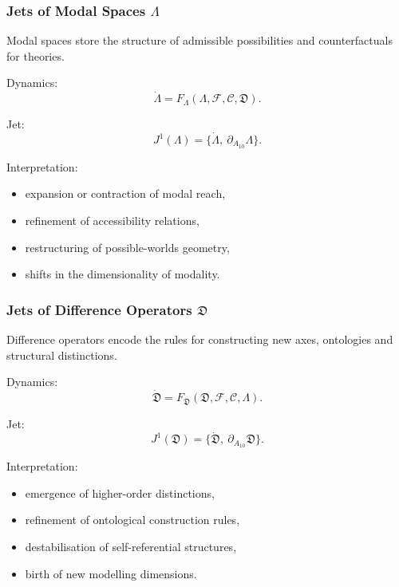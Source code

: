 \subsubsection{Jets of Modal Spaces \texorpdfstring{$\Lambda$}{\Lambda}}

Modal spaces store the structure of admissible possibilities and
counterfactuals for theories.

Dynamics:
\[
\dot{\Lambda}
=
F_{\Lambda}(\Lambda,\mathcal{F},\mathcal{C},\mathfrak{D}).
\]

Jet:
\[
J^1(\Lambda)=\{\dot{\Lambda},\ \partial_{A_{10}}\Lambda\}.
\]

Interpretation:
\begin{itemize}
    \item expansion or contraction of modal reach,
    \item refinement of accessibility relations,
    \item restructuring of possible-worlds geometry,
    \item shifts in the dimensionality of modality.
\end{itemize}


\subsubsection{Jets of Difference Operators $\mathfrak{D}$}

Difference operators encode the rules for constructing new axes,
ontologies and structural distinctions.

Dynamics:
\[
\dot{\mathfrak{D}}
=
F_{\mathfrak{D}}(\mathfrak{D},\mathcal{F},\mathcal{C},\Lambda).
\]

Jet:
\[
J^1(\mathfrak{D}) = 
\{\dot{\mathfrak{D}},\ \partial_{A_{10}}\mathfrak{D}\}.
\]

Interpretation:
\begin{itemize}
    \item emergence of higher-order distinctions,
    \item refinement of ontological construction rules,
    \item destabilisation of self-referential structures,
    \item birth of new modelling dimensions.
\end{itemize}


